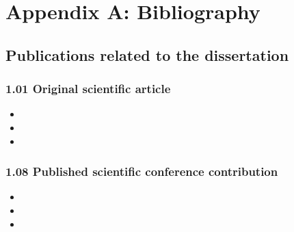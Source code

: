 \chapter*{\vspace{-2.3cm} \Large Appendix A: Bibliography \vspace{1.7cm}}
\label{chap:pub}

\fancyhead[LO]{}

\section*{Publications related to the dissertation}

\subsection*{1.01 Original scientific article}
\begin{itemize}
	\item {}
	\item {} 
	\item {} 
\end{itemize}


\subsection*{1.08 Published scientific conference contribution}
\begin{itemize}
	\item {}
	\item {} 
	\item {} 
\end{itemize}

